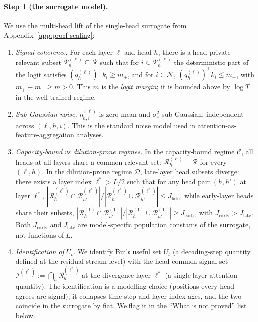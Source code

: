 \documentclass{article} %
\begin{document}
\paragraph{Step 1 (the surrogate model).}
We use the multi-head lift of the single-head surrogate from
Appendix~\ref{app:proof-scaling}:
\begin{enumerate}
  \item[\textbf{(A1)}] \emph{Signal coherence.} For each layer $\ell$ and head
  $h$, there is a head-private relevant subset $\mathcal{R}^{(\ell)}_h
  \subseteq \mathcal{R}$ such that for $i \in \mathcal{R}^{(\ell)}_h$ the
  deterministic part of the logit satisfies
  $(q^{(\ell)}_h)^\top k_i \geq m_+$, and for $i \in \mathcal{N}$,
  $(q^{(\ell)}_h)^\top k_i \leq m_-$, with $m_+ - m_- \geq m > 0$.
  This $m$ is the \emph{logit margin}; it is bounded above by $\log T$ in
  the well-trained regime.
  \item[\textbf{(A2)}] \emph{Sub-Gaussian noise.}
  $\eta^{(\ell)}_{h, i}$ is zero-mean and $\sigma_z^2$-sub-Gaussian,
  independent across $(\ell, h, i)$. This is the standard noise model
  used in attention-as-feature-aggregation analyses.
  \item[\textbf{(A3)}] \emph{Capacity-bound vs dilution-prone regimes.}
  In the capacity-bound regime $\mathcal{C}$, all heads at all layers share a
  common relevant set: $\mathcal{R}^{(\ell)}_h = \mathcal{R}$ for every
  $(\ell, h)$. In the dilution-prone regime $\mathcal{D}$, late-layer head
  subsets diverge: there exists a layer index $\ell^* > L/2$ such that for
  any head pair $(h, h')$ at layer $\ell^*$,
  $|\mathcal{R}^{(\ell^*)}_h \cap \mathcal{R}^{(\ell^*)}_{h'}|
  / |\mathcal{R}^{(\ell^*)}_h \cup \mathcal{R}^{(\ell^*)}_{h'}|
  \leq J_{\text{late}}$, while early-layer heads share their subsets,
  $|\mathcal{R}^{(1)}_h \cap \mathcal{R}^{(1)}_{h'}| /
  |\mathcal{R}^{(1)}_h \cup \mathcal{R}^{(1)}_{h'}| \geq J_{\text{early}}$,
  with $J_{\text{early}} > J_{\text{late}}$. Both $J_{\text{early}}$
  and $J_{\text{late}}$ are model-specific population constants of the
  surrogate, not functions of $L$.
  \item[\textbf{(A4)}] \emph{Identification of $U_t$.} We identify Bui's
  useful set $U_t$ (a decoding-step quantity defined at the
  residual-stream level) with the head-common signal set
  $\mathcal{I}^{(\ell^*)} := \bigcap_h \mathcal{R}^{(\ell^*)}_h$ at the
  divergence layer $\ell^*$ (a single-layer attention quantity). The
  identification is a modelling choice (positions every head agrees are
  signal); it collapses time-step and layer-index axes, and the two
  coincide in the surrogate by fiat. We flag it in the ``What is not
  proved'' list below.
\end{enumerate}
\end{document}

